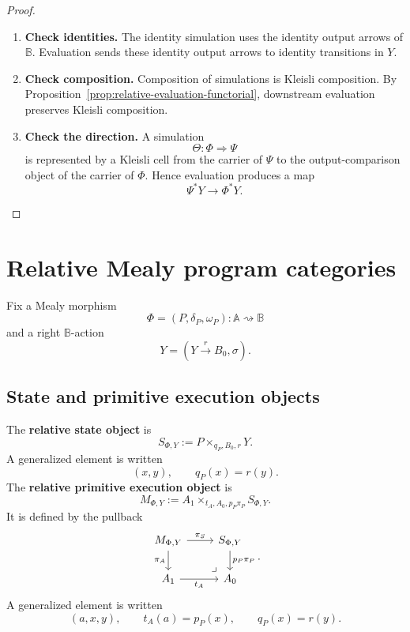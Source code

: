 \begin{proof}
\leavevmode
\begin{enumerate}
\item \textbf{Check identities.}
The identity simulation uses the identity output arrows of \(\mathbb B\).
Evaluation sends these identity output arrows to identity transitions in \(Y\).

\item \textbf{Check composition.}
Composition of simulations is Kleisli composition. By
Proposition~\ref{prop:relative-evaluation-functorial}, downstream evaluation
preserves Kleisli composition.

\item \textbf{Check the direction.}
A simulation
\[
\Theta:\Phi\Rightarrow\Psi
\]
is represented by a Kleisli cell from the carrier of \(\Psi\) to the
output-comparison object of the carrier of \(\Phi\). Hence evaluation produces
a map
\[
\Psi^\ast Y\to\Phi^\ast Y.
\]
\end{enumerate}
\end{proof}

\section{Relative Mealy program categories}
\label{sec:relative-program-categories}

Fix a Mealy morphism
\[
\Phi=(P,\delta_P,\omega_P):\mathbb A\rightsquigarrow\mathbb B
\]
and a right \(\mathbb B\)-action
\[
Y=(Y\xrightarrow{r}B_0,\sigma).
\]

\subsection{State and primitive execution objects}
\label{subsec:relative-state-primitive-objects}

\begin{definition}
\label{def:relative-state-and-primitive}
The \textbf{relative state object} is
\[
S_{\Phi,Y}:=P\times_{q_P,B_0,r}Y.
\]
A generalized element is written
\[
(x,y),
\qquad
q_P(x)=r(y).
\]
The \textbf{relative primitive execution object} is
\[
M_{\Phi,Y}
:=
A_1\times_{t_A,A_0,p_P\pi_P}S_{\Phi,Y}.
\]
It is defined by the pullback
\[
\begin{tikzcd}
M_{\Phi,Y}
\arrow[r,"\pi_S"]
\arrow[d,"\pi_A"']
&
S_{\Phi,Y}
\arrow[d,"p_P\pi_P"]
\\
A_1
\arrow[r,"t_A"']
&
A_0
\arrow[ul,phantom,very near start,"\lrcorner"]
\end{tikzcd}
.
\]
A generalized element is written
\[
(a,x,y),
\qquad
t_A(a)=p_P(x),
\qquad
q_P(x)=r(y).
\]
\end{definition}

